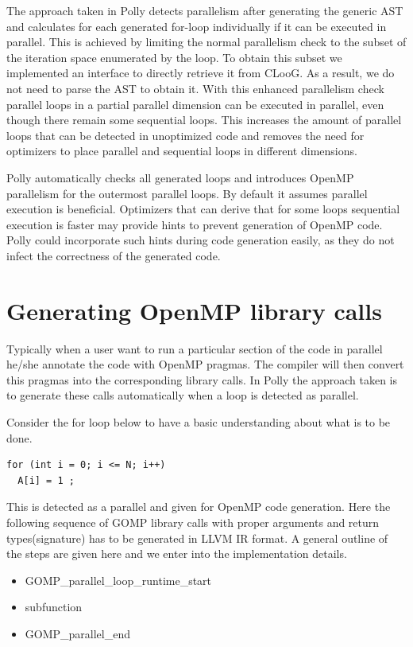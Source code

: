 The approach taken in Polly detects parallelism after generating the generic
AST and calculates for each generated for-loop individually if it can be
executed in parallel. This is achieved by limiting the normal parallelism check
to the subset of the iteration space enumerated by the loop. To obtain this subset
we implemented an interface to directly retrieve it from CLooG. As a result,
we do not need to parse the AST to obtain it. With this enhanced parallelism
check parallel loops in a partial parallel dimension can be executed in
parallel, even though there remain some sequential loops. This increases the
amount of parallel loops that can be detected in unoptimized code and removes
the need for optimizers to place parallel and sequential loops in different
dimensions.

Polly automatically checks all generated loops and introduces OpenMP
parallelism for the outermost parallel loops. By default it assumes parallel
execution is beneficial. Optimizers that can derive that for some loops
sequential execution is faster may provide hints to prevent generation of
OpenMP code. Polly could incorporate such hints during code generation easily,
as they do not infect the correctness of the generated code.


\section{Generating OpenMP library calls}

Typically when a user want to run a particular section of the code in parallel he/she annotate the code with
OpenMP pragmas. The compiler will then convert this pragmas into the corresponding library calls. In Polly the
approach taken is to generate these calls automatically when a loop is detected as parallel.

Consider the for loop below to have a basic understanding about what is to be done.
{\footnotesize
\begin{lstlisting}
for (int i = 0; i <= N; i++)
  A[i] = 1 ;
\end{lstlisting}
}
This is detected as a parallel and given for OpenMP code generation. Here the following
sequence of GOMP library calls with proper arguments and return types(signature) has to be generated in
LLVM IR format. A general outline of the steps are given here and we enter into the implementation details.

\begin{itemize}
\item GOMP\_parallel\_loop\_runtime\_start
\item subfunction
\item GOMP\_parallel\_end
\end{itemize}

